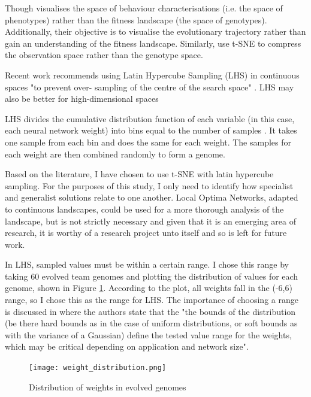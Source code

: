 \documentclass[12pt]{article}
\begin{document}
Though \cite{wang:GECCO:2018} visualises the space of behaviour characterisations (i.e. the space of phenotypes) rather than the fitness landscape (the space of genotypes).
Additionally, their objective is to visualise the evolutionary trajectory rather than gain an understanding of the fitness landscape.
Similarly, \cite{risi:GECCO:2019} use t-SNE to compress the observation space rather than the genotype space.

Recent work recommends using Latin Hypercube Sampling (LHS) in continuous spaces "to prevent over- sampling of the centre of the search space" \cite{ochoa:GECCO:2019}.
LHS may also be better for high-dimensional spaces  \cite{contreras:ICBMTA:2020}

LHS divides the cumulative distribution function of each variable (in this case, each neural network weight) into bins equal to the number of samples \cite{helton:RESS:2003}.
It takes one sample from each bin and does the same for each weight.
The samples for each weight are then combined randomly to form a genome.

Based on the literature, I have chosen to use t-SNE with latin hypercube sampling. For the purposes of this study, I only need to identify how specialist and generalist solutions relate to one another. Local Optima Networks, adapted to continuous landscapes, could be used for a more thorough analysis of the landscape, but is not strictly necessary and given that it is an emerging area of research, it is worthy of a research project unto itself and so is left for future work.

In LHS, sampled values must be within a certain range.
I chose this range by taking 60 evolved team genomes and plotting the distribution of values for each genome, shown in Figure \ref{fig:weight_distribution}.
According to the plot, all weights fall in the (-6,6) range, so I chose this as the range for LHS.
The importance of choosing a range is discussed in \cite{oller:AAMAS:2020} where the authors state that the "the bounds of the distribution (be there hard bounds as in the case of uniform distributions, or soft bounds as with the variance of a Gaussian) define the tested value range for the weights, which may be critical depending on application and network size". 

\begin{figure}[h]
\centering
\texttt{[image: weight\_distribution.png]}
\caption{Distribution of weights in evolved genomes}
\label{fig:weight_distribution}
\end{figure}
\end{document}

